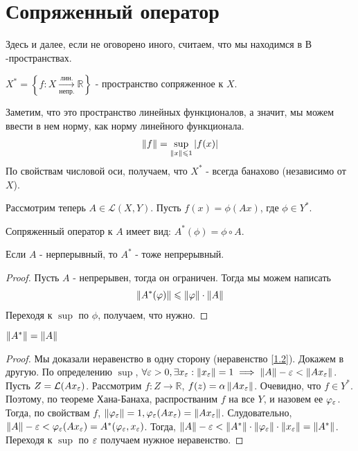 \section{Сопряженный оператор}

Здесь и далее, если не оговорено иного, считаем, что мы находимся в $В$-пространствах.

\begin{definition}
	$X^* = \left\{ f : X \xrightarrow[\text{непр.}]{\text{лин.}} \mathbb{R} \right\}$ - пространство сопряженное к $X$.
\end{definition}
Заметим, что это пространство линейных функционалов, а значит, мы можем ввести в нем норму, как норму линейного функционала.
\begin{gather}
	\left\|f\right\| = \sup\limits_{\left\|x\right\| \leqslant 1} \left|f(x)\right| 
\end{gather}
По свойствам числовой оси, получаем, что $X^*$ - всегда банахово (независимо от $X$).

Рассмотрим теперь $A \in \mathcal{L}(X, Y)$. Пусть $f(x) = \phi(Ax)$, где $\phi \in Y^*$.
\begin{definition}
	Сопряженный оператор к $A$ имеет вид: $A^*(\phi) = \phi \circ A$.
\end{definition}
\begin{statement}
	Если $A$ - нерперывный, то $A^*$ - тоже непрерывный.
\end{statement}
\begin{proof}
	Пусть $A$ - непрерывен, тогда он ограничен. Тогда мы можем написать
	\begin{gather}
		\left\|A^*(\varphi)\right\| \leqslant \left\|\varphi\right\| \cdot \left\|A\right\| \label{1.2}
	\end{gather}
	Переходя к $\sup$ по $\phi$, получаем, что нужно.
\end{proof}
\begin{theorem}
	$\left\|A^*\right\| = \left\|A\right\|$ \label{th1.2}
\end{theorem}
\begin{proof}
	Мы доказали неравенство в одну сторону (неравенство \ref{1.2}). Докажем в другую. 
	По определению $\sup$, $\forall \varepsilon > 0, \exists x_{\varepsilon} : \left\|x_{\varepsilon}\right\| = 1 \implies \left\|A\right\| - \varepsilon < \left\|Ax_{\varepsilon}\right\|$.
	Пусть $Z = \mathcal{L}(Ax_{\varepsilon})$. Рассмотрим $f : Z \rightarrow \mathbb{R}$, $f(z) = \alpha\left\|Ax_{\varepsilon}\right\|$. Очевидно, что $f \in Y^*$. 
	Поэтому, по теореме Хана-Банаха, распростваним $f$ на все $Y$, и назовем ее $\varphi_{\varepsilon}$.
	Тогда, по свойствам $f$, $\left\|\varphi_{\varepsilon}\right\| = 1, \varphi_{\varepsilon}(Ax_{\varepsilon}) = \left\|Ax_{\varepsilon}\right\|$.
	Слудовательно, $\left\|A\right\| - \varepsilon < \varphi_{\varepsilon}(Ax_{\varepsilon}) = A^*(\varphi_{\varepsilon}, x_{\varepsilon})$.
	Тогда, $\left\|A\right\| - \varepsilon < \left\|A^*\right\| \cdot \left\|\varphi_{\varepsilon}\right\| \cdot \left\|x_{\varepsilon}\right\| = \left\|A^*\right\|$. 
	Переходя к $\sup$ по $\varepsilon$ получаем нужное неравенство.
\end{proof}

